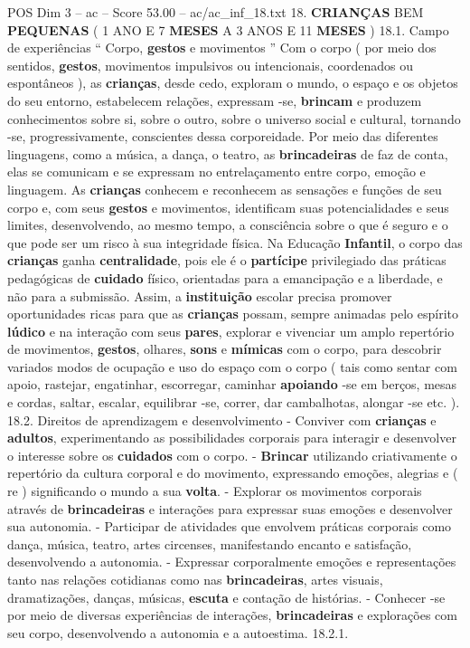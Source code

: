 \begin{textsample}{POS Dim 3 – ac – Score 53.00 – ac/ac\_inf\_18.txt}  \label{ex:f3_pos_022}
18. \textbf{CRIANÇAS} BEM \textbf{PEQUENAS} ( 1 ANO E 7 \textbf{MESES} A 3 ANOS E 11 \textbf{MESES} ) 18.1.
Campo de experiências “ Corpo, \textbf{gestos} e movimentos ” Com o corpo ( por meio dos sentidos, \textbf{gestos}, movimentos impulsivos ou intencionais, coordenados ou espontâneos ), as \textbf{crianças}, desde cedo, exploram o mundo, o espaço e os objetos do seu entorno, estabelecem relações, expressam -se, \textbf{brincam} e produzem conhecimentos sobre si, sobre o outro, sobre o universo social e cultural, tornando -se, progressivamente, conscientes dessa corporeidade.
Por meio das diferentes linguagens, como a música, a dança, o teatro, as \textbf{brincadeiras} de faz de conta, elas se comunicam e se expressam no entrelaçamento entre corpo, emoção e linguagem.
As \textbf{crianças} conhecem e reconhecem as sensações e funções de seu corpo e, com seus \textbf{gestos} e movimentos, identificam suas potencialidades e seus limites, desenvolvendo, ao mesmo tempo, a consciência sobre o que é seguro e o que pode ser um risco à sua integridade física.
Na Educação \textbf{Infantil}, o corpo das \textbf{crianças} ganha \textbf{centralidade}, pois ele é o \textbf{partícipe} privilegiado das práticas pedagógicas de \textbf{cuidado} físico, orientadas para a emancipação e a liberdade, e não para a submissão.
Assim, a \textbf{instituição} escolar precisa promover oportunidades ricas para que as \textbf{crianças} possam, sempre animadas pelo espírito \textbf{lúdico} e na interação com seus \textbf{pares}, explorar e vivenciar um amplo repertório de movimentos, \textbf{gestos}, olhares, \textbf{sons} e \textbf{mímicas} com o corpo, para descobrir variados modos de ocupação e uso do espaço com o corpo ( tais como sentar com apoio, rastejar, engatinhar, escorregar, caminhar \textbf{apoiando} -se em berços, mesas e cordas, saltar, escalar, equilibrar -se, correr, dar cambalhotas, alongar -se etc. ). 18.2.
Direitos de aprendizagem e desenvolvimento - Conviver com \textbf{crianças} e \textbf{adultos}, experimentando as possibilidades corporais para interagir e desenvolver o interesse sobre os \textbf{cuidados} com o corpo. - \textbf{Brincar} utilizando criativamente o repertório da cultura corporal e do movimento, expressando emoções, alegrias e ( re ) significando o mundo a sua \textbf{volta}. - Explorar os movimentos corporais através de \textbf{brincadeiras} e interações para expressar suas emoções e desenvolver sua autonomia. - Participar de atividades que envolvem práticas corporais como dança, música, teatro, artes circenses, manifestando encanto e satisfação, desenvolvendo a autonomia. - Expressar corporalmente emoções e representações tanto nas relações cotidianas como nas \textbf{brincadeiras}, artes visuais, dramatizações, danças, músicas, \textbf{escuta} e contação de histórias. - Conhecer -se por meio de diversas experiências de interações, \textbf{brincadeiras} e explorações com seu corpo, desenvolvendo a autonomia e a autoestima. 18.2.1.

\end{textsample}
